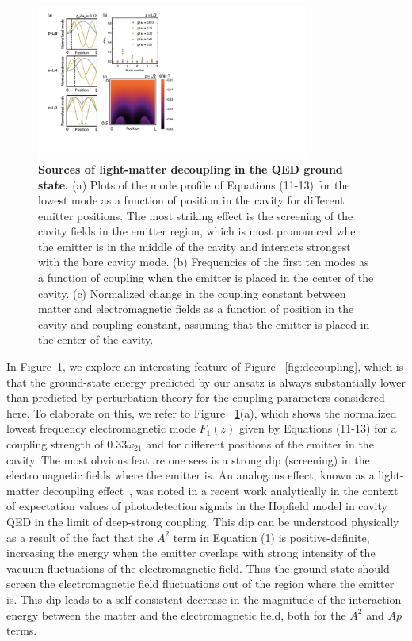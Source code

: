 \documentclass[aps,prb,twocolumn,
	groupedaddress,superscriptaddress,
	amsfonts,amssymb,amsmath,floatfix,
	citeautoscript]{revtex4-1}
\begin{document}
\begin{figure}[t]
\includegraphics[width=9cm]{fig3.pdf}
\caption{\textbf{Sources of light-matter decoupling in the QED ground state.} (a) Plots of the mode profile of Equations (11-13) for the lowest mode as a function of position in the cavity for different emitter positions. The most striking effect is the screening of the cavity fields in the emitter region, which is most pronounced when the emitter is in the middle of the cavity and interacts strongest with the bare cavity mode. (b) Frequencies of the first ten modes as a function of coupling when the emitter is placed in the center of the cavity. (c) Normalized change in the coupling constant between matter and electromagnetic fields as a function of position in the cavity and coupling constant, assuming that the emitter is placed in the center of the cavity.  }
\label{fig:sources_decoupling}
\end{figure}

In Figure~\ref{fig:sources_decoupling}, we explore an interesting feature of Figure ~\ref{fig:decoupling}, which is that the ground-state energy predicted by our ansatz is always substantially lower than predicted by perturbation theory for the coupling parameters considered here. To elaborate on this, we refer to Figure ~\ref{fig:sources_decoupling}(a), which shows the normalized lowest frequency electromagnetic mode $F_1(z)$ given by Equations (11-13) for a coupling strength of $0.33\omega_{21}$ and for different positions of the emitter in the cavity. The most obvious feature one sees is a strong dip (screening) in the electromagnetic fields where the emitter is. An analogous effect, known as a light-matter decoupling effect~\cite{liberato2014}, was noted in a recent work analytically in the context of expectation values of photodetection signals in the Hopfield model in cavity QED in the limit of deep-strong coupling. This dip can be understood physically as a result of the fact that the $A^2$ term in Equation (1) is positive-definite, increasing the energy when the emitter overlaps with strong intensity of the vacuum fluctuations of the electromagnetic field. Thus the ground state should screen the electromagnetic field fluctuations out of the region where the emitter is. This dip leads to a self-consistent decrease in the magnitude of the interaction energy between the matter and the electromagnetic field, both for the $A^2$ and $Ap$ terms. 
\end{document}
